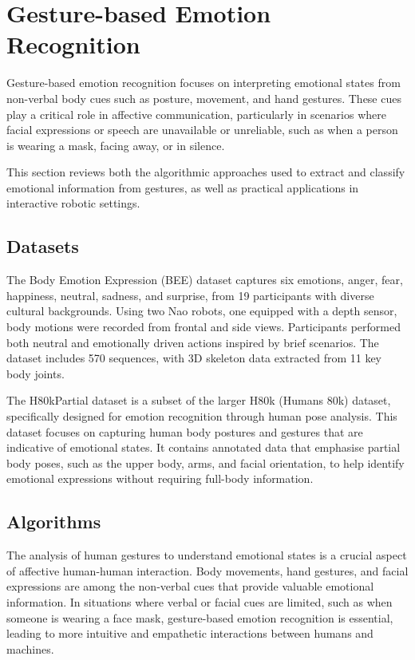 \section{Gesture-based Emotion Recognition}

Gesture-based emotion recognition focuses on interpreting emotional states from non-verbal body cues such as posture, movement, and hand gestures. These cues play a critical role in affective communication, particularly in scenarios where facial expressions or speech are unavailable or unreliable, such as when a person is wearing a mask, facing away, or in silence.

This section reviews both the algorithmic approaches used to extract and classify emotional information from gestures, as well as practical applications in interactive robotic settings.

\subsection{Datasets}

The Body Emotion Expression (BEE) dataset \cite{Elfaramawy2017-ab} captures six emotions, anger, fear, happiness, neutral, sadness, and surprise, from 19 participants with diverse cultural backgrounds. Using two Nao robots, one equipped with a depth sensor, body motions were recorded from frontal and side views. Participants performed both neutral and emotionally driven actions inspired by brief scenarios. The dataset includes 570 sequences, with 3D skeleton data extracted from 11 key body joints.

The H80kPartial dataset \cite{8578328} is a subset of the larger H80k (Humans 80k) dataset, specifically designed for emotion recognition through human pose analysis. This dataset focuses on capturing human body postures and gestures that are indicative of emotional states. It contains annotated data that emphasise partial body poses, such as the upper body, arms, and facial orientation, to help identify emotional expressions without requiring full-body information.

\subsection{Algorithms}

The analysis of human gestures to understand emotional states is a crucial aspect of affective human-human interaction. Body movements, hand gestures, and facial expressions are among the non-verbal cues that provide valuable emotional information. In situations where verbal or facial cues are limited, such as when someone is wearing a face mask, gesture-based emotion recognition is essential, leading to more intuitive and empathetic interactions between humans and machines.

